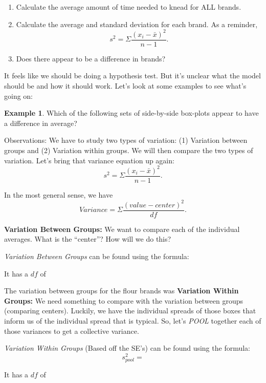 \documentclass[12pt]{amsart}
\theoremstyle{definition}
\newtheorem{ex}{Example}
\begin{document}
 \begin{enumerate}
  \item Calculate the average amount of time needed to knead for ALL brands.
  \vspace{0.5in}
  \item Calculate the average and standard deviation for each brand. As a reminder, $$s^2=\Sigma \frac{(x_i-\bar{x})^2}{n-1}.$$
  \vfill
  \item Does there appear to be a difference in brands?
  \vfill
 \end{enumerate}
\newpage
\noindent It feels like we should be doing a hypothesis test. But it's unclear what the model should be and how it should work. Let's look at some examples to see what's going on:
\begin{ex}
 Which of the following sets of side-by-side box-plots appear to have a difference in average?
\end{ex}

\vfill
\vfill
\vfill
Observations:
\vfill
We have to study two types of variation: (1) Variation between groups and (2) Variation within groups. We will then compare the two types of variation.
\newpage
\noindent Let's bring that variance equation up again: $$s^2=\Sigma \frac{(x_i-\bar{x})^2}{n-1}.$$

In the most general sense, we have $$Variance=\Sigma \frac{(value-center)^2}{df}.$$

\noindent \textbf{Variation Between Groups:} We want to compare each of the individual averages. What is the ``center''? How will we do this?
\vfill

\begin{framed}
 \emph{Variation Between Groups} can be found using the formula: \vspace{1in}
 
 It has a $df$ of \underline{\hspace{0.25in}}
\end{framed}

The variation between groups for the flour brands was \underline{\hspace{0.5in}}
\newpage
\noindent \textbf{Variation Within Groups:} We need something to compare with the variation between groups (comparing centers). Luckily, we have the individual spreads of those boxes that inform us of the individual spread that is typical. So, let's \emph{POOL} together each of those variances to get a collective variance.
\vfill

\begin{framed}
 \emph{Variation Within Groups} (Based off the SE's) can be found using the formula: $$s_{pool}^2=$$\vspace{1in}
 
 It has a $df$ of \underline{\hspace{0.25in}}
\end{framed}
\end{document}
